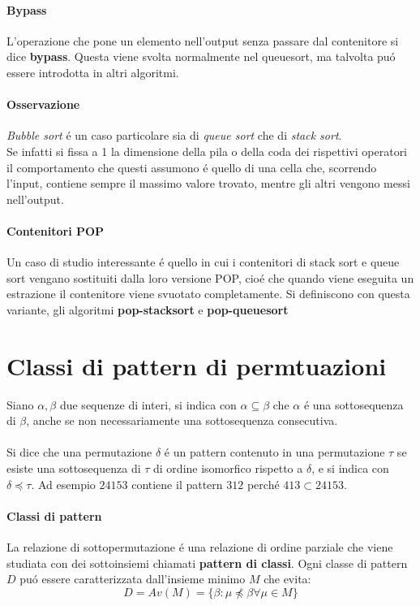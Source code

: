 \paragraph*{Bypass} L'operazione che pone un elemento nell'output senza passare dal contenitore si dice \textbf{bypass}. Questa viene svolta normalmente nel queuesort, ma talvolta pu\'o essere introdotta in altri algoritmi.
\paragraph*{Osservazione}\textit{Bubble sort} \'e un caso particolare sia di \textit{queue sort} che di \textit{stack sort}.\\
Se infatti si fissa a 1 la dimensione della pila o della coda dei rispettivi operatori il comportamento che questi assumono \'e quello di una cella che, scorrendo l'input, contiene sempre il massimo valore trovato, mentre gli altri vengono messi nell'output.
\paragraph*{Contenitori POP}Un caso di studio interessante \'e quello in cui i contenitori di stack sort e queue sort vengano sostituiti dalla loro versione POP, cio\'e che quando viene eseguita un estrazione il contenitore viene svuotato completamente. Si definiscono con questa variante, gli algoritmi \textbf{pop-stacksort} e \textbf{pop-queuesort} 
\section*{Classi di pattern di permtuazioni}
\cite{bouvel2022preimages}
Siano $\alpha,\beta$ due sequenze di interi, si indica con $\alpha \subseteq \beta$ che $\alpha$ \'e una sottosequenza di $\beta$, anche se non necessariamente una sottosequenza consecutiva.\\\\
Si dice che una permutazione $\delta$ \'e un pattern contenuto in una permutazione $\tau$ se esiste una sottosequenza di $\tau$ di ordine isomorfico rispetto a $\delta$, e si indica con $\delta\preceq\tau$. Ad esempio $24153$ contiene il pattern $312$ perch\'e $413\subset{24153}$.
\paragraph*{Classi di pattern} La relazione di sottopermutazione \'e una relazione di ordine parziale che viene studiata con dei sottoinsiemi chiamati \textbf{pattern di classi}. Ogni classe di pattern $D$ pu\'o essere caratterizzata dall'insieme minimo $M$ che evita:$$ D = Av(M) = \{\beta:\mu\not\preceq\beta\forall\mu\in M\}$$
